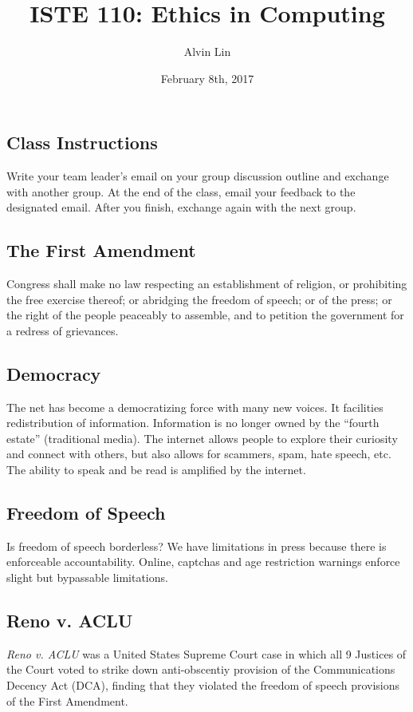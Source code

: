 \documentclass[letterpaper, 12pt]{article}
\title{ISTE 110: Ethics in Computing}
\author{Alvin Lin}
\date{February 8th, 2017}
\begin{document}
\maketitle

\subsection*{Class Instructions}
Write your team leader's email on your group discussion outline and exchange
with another group. At the end of the class, email your feedback to the
designated email. After you finish, exchange again with the next group.

\subsection*{The First Amendment}
Congress shall make no law respecting an establishment of religion, or
prohibiting the free exercise thereof; or abridging the freedom of speech; or
of the press; or the right of the people peaceably to assemble, and to petition
the government for a redress of grievances.

\subsection*{Democracy}
The net has become a democratizing force with many new voices. It facilities
redistribution of information. Information is no longer owned by the ``fourth
estate'' (traditional media). The internet allows people to explore their
curiosity and connect with others, but also allows for scammers, spam, hate
speech, etc. The ability to speak and be read is amplified by the internet.

\subsection*{Freedom of Speech}
Is freedom of speech borderless? We have limitations in press because there is
enforceable accountability. Online, captchas and age restriction warnings
enforce slight but bypassable limitations.

\subsection*{Reno v. ACLU}
\textit{Reno v. ACLU} was a United States Supreme Court case in which all 9
Justices of the Court voted to strike down anti-obscentiy provision of the
Communications Decency Act (DCA), finding that they violated the freedom of
speech provisions of the First Amendment.
\end{document}
